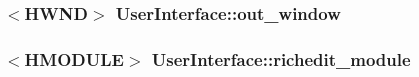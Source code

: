 \subsubsection[{out\-\_\-window}]{$<$H\-W\-N\-D$>$ User\-Interface\-::out\-\_\-window}\label{class_user_interface_ac0664b576cc8c7602b93ecad99bc1db2}
\subsubsection[{richedit\-\_\-module}]{$<$H\-M\-O\-D\-U\-L\-E$>$ User\-Interface\-::richedit\-\_\-module}\label{class_user_interface_aa90dd9e865c9f60e9c1e2b912f8accc2}
